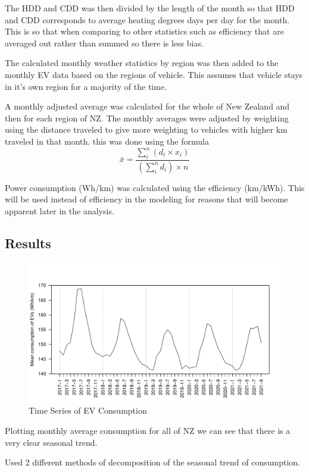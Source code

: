 \documentclass[
]{article}
\begin{document}
The HDD and CDD was then divided by the length of the month so that HDD
and CDD corresponds to average heating degrees days per day for the
month. This is so that when comparing to other statistics such as
efficiency that are averaged out rather than summed so there is less
bias.

The calculated monthly weather statistics by region was then added to
the monthly EV data based on the regions of vehicle. This assumes that
vehicle stays in it's own region for a majority of the time.

A monthly adjusted average was calculated for the whole of New Zealand
and then for each region of NZ. The monthly averages were adjusted by
weighting using the distance traveled to give more weighting to vehicles
with higher km traveled in that month. this was done using the formula
\[\bar{x} = \frac{\sum_{i}^{n} (d_i\times x_i)}{\left(\sum_{i}^{n} d_i\right)\times n}\]

Power consumption (Wh/km) was calculated using the efficiency (km/kWh).
This will be used instead of efficiency in the modeling for reasons that
will become apparent later in the analysis.

\hypertarget{results}{%
\subsection{Results}\label{results}}

\begin{figure}
\centering
\includegraphics{summary_week4_files/figure-latex/eff_plot-1.pdf}
\caption{Time Series of EV Consumption}
\end{figure}

Plotting monthly average consumption for all of NZ we can see that there
is a very clear seasonal trend.

Used 2 different methods of decomposition of the seasonal trend of
consumption.
\end{document}
